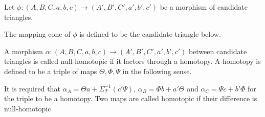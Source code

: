     \begin{definition}
        Let $\phi : (A,B,C,a,b,c) \rightarrow (A',B',C',a',b',c')$ be a morphism of candidate triangles.
        \begin{center}
        \end{center}
        The mapping cone of $\phi$ is defined to be the candidate triangle below.
        \begin{center}
        \end{center}
    \end{definition}

    \begin{definition}
        A morphism $\alpha : (A,B,C,a,b,c) \rightarrow (A',B',C',a',b',c')$ between candidate triangles is called null-homotopic if it factors through a homotopy. A homotopy is defined to be a triple of maps $\Theta, \Phi, \Psi$ in the following sense.
        \begin{center}
        \end{center}
        It is required that $\alpha_A  = \Theta a + \Sigma_{\mathcal{T}}^{-1}(c'\Psi)$, $\alpha_B = \Phi b + a'\Theta$ and $\alpha_C = \Psi c + b'\Phi$ for the triple to be a homotopy.
        Two maps are called homotopic if their difference is null-homotopic
    \end{definition}

